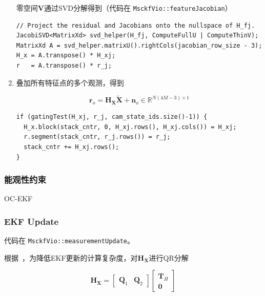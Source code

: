 \documentclass[12pt,a4paper]{article}
\begin{document}
\begin{enumerate}
零空间$\mathbf{V}$通过SVD分解得到（代码在 \verb|MsckfVio::featureJacobian|）
\begin{lstlisting}
// Project the residual and Jacobians onto the nullspace of H_fj.
JacobiSVD<MatrixXd> svd_helper(H_fj, ComputeFullU | ComputeThinV);
MatrixXd A = svd_helper.matrixU().rightCols(jacobian_row_size - 3);
H_x = A.transpose() * H_xj;
r   = A.transpose() * r_j;
\end{lstlisting}

\item 叠加所有特征点的多个观测，得到

\begin{equation}
\label{equ:visual_residual_final}
\mathbf{r}_{o}=\mathbf{H}_{\mathbf{X}} \widetilde{\mathbf{X}}+\mathbf{n}_{o}
\in \mathbb{R}^{N(4M-3) \times 1}
\end{equation}

\begin{lstlisting}
if (gatingTest(H_xj, r_j, cam_state_ids.size()-1)) {
  H_x.block(stack_cntr, 0, H_xj.rows(), H_xj.cols()) = H_xj;
  r.segment(stack_cntr, r_j.rows()) = r_j;
  stack_cntr += H_xj.rows();
}
\end{lstlisting}

\end{enumerate}


\subsubsection{能观性约束}

OC-EKF


\subsubsection{EKF Update}

代码在 \verb|MsckfVio::measurementUpdate|。

根据~\cite{mourikis2007multi}，为降低EKF更新的计算复杂度，对$\mathbf{H}_{\mathbf{X}}$进行QR分解

\begin{equation}
\mathbf{H}_{\mathbf{X}}=\left[\begin{array}{ll}{\mathbf{Q}_{1}} & {\mathbf{Q}_{2}}\end{array}\right]\left[\begin{array}{c}{\mathbf{T}_{H}} \\ {\mathbf{0}}\end{array}\right]
\end{equation}
\end{document}
